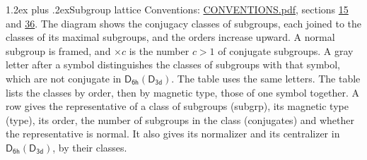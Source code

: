 \documentclass[10pt,a4paper]{article}
\makeatletter
\renewcommand\section{\@startsection{section}{1}{\z@}{-3ex plus -1ex minus -.2ex}%
  {1.2ex plus .2ex}{\normalfont\large\sffamily\bfseries\color{parttitle}}}
\numberwithin{equation}{section}
\newcommand{\grp}[1]{\mathsf{#1}}
\makeatother
\begin{document}
\section{Subgroup lattice}\label{s:subgroups}
Conventions: \href{../../CONVENTIONS.pdf}{CONVENTIONS.pdf}, sections \href{../../../rotation/CONVENTIONS.pdf\#conv.15}{15} and \href{../../CONVENTIONS.pdf\#conv.36}{36}.
The diagram shows the conjugacy classes of subgroups, each joined to the classes of its maximal subgroups, and the orders increase upward. \label{n:index.conjugates.c}\label{n:mark.conjugates}A normal subgroup is framed, and ${\times}c$ is the number $c > 1$ of conjugate subgroups. \label{n:mark.letter}A gray letter after a symbol distinguishes the classes of subgroups with that symbol, which are not conjugate in $\grp{D_{6h}}(\grp{D_{3d}})$. The table uses the same letters. The table lists the classes by order, then by magnetic type, those of one symbol together. \label{n:head.subgroup}\label{n:head.magnetic.type}\label{n:head.order}\label{n:head.conjugates}\label{n:head.normal}A row gives the representative of a class of subgroups (subgrp), its magnetic type (type), its order, the number of subgroups in the class (conjugates) and whether the representative is normal. \label{n:head.normalizer}\label{n:head.centralizer}It also gives its normalizer and its centralizer in $\grp{D_{6h}}(\grp{D_{3d}})$, by their classes. 
\end{document}
